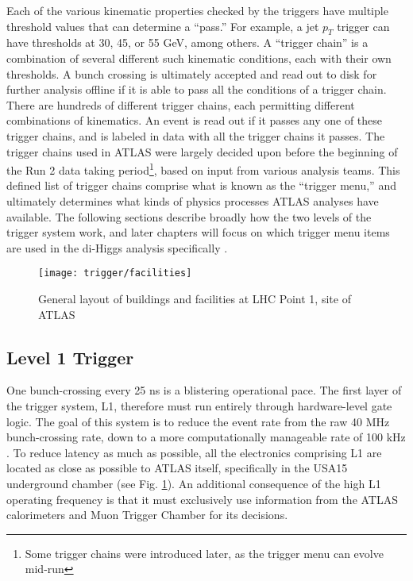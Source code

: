     Each of the various kinematic properties checked by the triggers have multiple threshold values that can determine a ``pass.''
    For example, a jet $p_T$ trigger can have thresholds at 30, 45, or 55 GeV, among others.
    A ``trigger chain'' is a combination of several different such kinematic conditions, each with their own thresholds.
    A bunch crossing is ultimately accepted and read out to disk for further analysis offline if it is able to pass all the conditions of a trigger chain.
    There are hundreds of different trigger chains, each permitting different combinations of kinematics.
    An event is read out if it passes any one of these trigger chains, and is labeled in data with all the trigger chains it passes.
    The trigger chains used in ATLAS were largely decided upon before the beginning of the Run 2 data taking period\footnote{
        Some trigger chains were introduced later, as the trigger menu can evolve mid-run
        }, based on input from various analysis teams.
    This defined list of trigger chains comprise what is known as the ``trigger menu,'' and ultimately determines what kinds of physics processes ATLAS analyses have available.
    The following sections describe broadly how the two levels of the trigger system work, and later chapters will focus on which trigger menu items are used in the di-Higgs analysis specifically .

    \begin{figure}[h]
        \texttt{[image: trigger/facilities]}
        \caption{General layout of buildings and facilities at LHC Point 1, site of ATLAS \cite{trigger_tdr}}
        \label{fig:facilities}
    \end{figure}


    \subsection{Level 1 Trigger}\label{sec:L1}

        One bunch-crossing every 25 ns is a blistering operational pace.
        The first layer of the trigger system, L1, therefore must run entirely through hardware-level gate logic.
        The goal of this system is to reduce the event rate from the raw 40 MHz bunch-crossing rate,
            down to a more computationally manageable rate of 100 kHz \cite{trigger_run2}.
        To reduce latency as much as possible, all the electronics comprising L1 are located as close as possible to ATLAS itself, specifically in the USA15 underground chamber \cite{trigger_tdr} (see Fig. \ref{fig:facilities}).
        An additional consequence of the high L1 operating frequency
            is that it must exclusively use information from the ATLAS calorimeters and Muon Trigger Chamber for its decisions.

